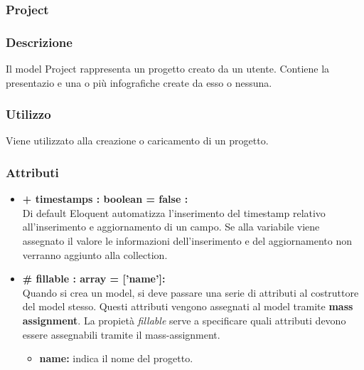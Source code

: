 \newpage
\subsubsection{Project}


	\subsubsection*{Descrizione}
	Il model Project rappresenta un progetto creato da un utente. Contiene la presentazio e una o
più infografiche create da esso o nessuna.

	\subsubsection*{Utilizzo}
	Viene utilizzato alla creazione o caricamento di un progetto.
	
	\subsubsection*{Attributi}
	\begin{itemize}
		\item \textbf{+ timestamps : boolean = false :}\\
		Di default Eloquent automatizza l'inserimento del timestamp relativo all'inserimento e aggiornamento di un campo. Se alla variabile viene assegnato il valore le informazioni dell'inserimento e del aggiornamento non verranno aggiunto alla collection.
		\item \textbf{\# fillable : array = [’name’]:}\\
		Quando si crea un model, si deve passare una serie di attributi al costruttore del model stesso. Questi attributi vengono assegnati al model tramite \textbf{mass assignment}. La propietà \textit{fillable} serve a specificare quali attributi devono essere assegnabili tramite il mass-assignment.
		\begin{itemize}
			\item \textbf{name:} indica il nome del progetto.
		\end{itemize}
	\end{itemize}
	
